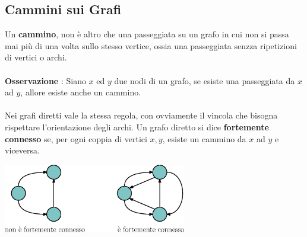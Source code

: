 \documentclass[12pt, letterpaper]{article}
\newcommand{\acc}{\\\hphantom{}\\}
\begin{document}
\subsection{Cammini sui Grafi}
Un \textbf{cammino}, non è altro che una passeggiata su un grafo in cui non 
si passa mai più di una volta sullo stesso vertice, ossia una passeggiata 
senzza ripetizioni di vertici o archi. \acc 
\textbf{Osservazione} : Siano $x$ ed $y$ due nodi di un grafo, se esiste 
una passeggiata da $x$ ad $y$, allore esiste anche un cammino.\acc 
Nei grafi diretti vale la stessa regola, con ovviamente il vincola che bisogna rispettare 
l'orientazione degli archi. Un grafo diretto si dice \textbf{fortemente connesso} 
se, per ogni coppia di vertici \(x,y\), esiste un cammino da \(x\) ad \(y\)
e viceversa. \begin{center}
    \includegraphics[width=0.6\textwidth ]{images/fortConnesso.eps}
\end{center}
\end{document}
